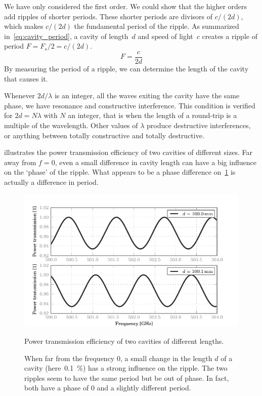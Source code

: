 We have only considered the first order.
We could show that the higher orders add ripples of shorter periods.
These shorter periods are divisors of $c/(2d)$, which makes $c/(2d)$ the fundamental period of the ripple.
As summarized in~\cref{eq:cavity_period}, a cavity of length~$d$ and speed of light~$c$ creates a ripple of period $F=F_s/2=c/(2d)$.
\begin{equation}
    F = \frac{c}{2d} \label{eq:cavity_period}
\end{equation}
By measuring the period of a ripple, we can determine the length of the cavity that causes it.

Whenever $2d/\lambda$ is an integer, all the waves exiting the cavity have the same phase, we have resonance and constructive interference.
This condition is verified for $2d=N\lambda$ with $N$ an integer, that is when the length of a round-trip is a multiple of the wavelength.
Other values of $\lambda$ produce destructive interferences, or anything between totally constructive and totally destructive.

 illustrates the power transmission efficiency of two cavities of different sizes.
Far away from $f=0$, even a small difference in cavity length can have a big influence on the `phase' of the ripple.
What appears to be a phase difference on~\cref{fig:cavity_sizes} is actually a difference in period.

\begin{figure}[hbtp]
    \centering
    \includegraphics{cavity_sizes}
    \caption{Power transmission efficiency of two cavities of different lengths.}
    \caption*{
        When far from the frequency 0, a small change in the length $d$ of a cavity (here~\SI{0.1}{\percent}) has a strong influence on the ripple.
        The two ripples seem to have the same period but be out of phase.
        In fact, both have a phase of 0 and a slightly different period.
    }
    \label{fig:cavity_sizes}
\end{figure}



